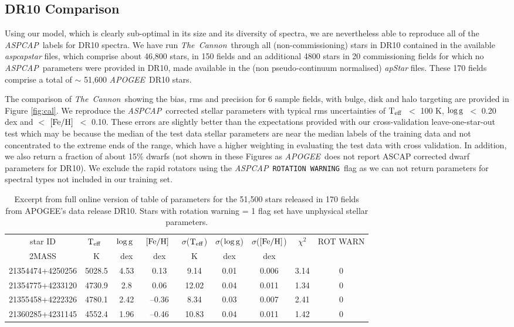 \documentclass[12pt, preprint]{aastex}
\newcommand{\teff}{\mbox{$\rm T_{eff}$}}
\newcommand{\feh}{\mbox{$\rm [Fe/H]$}}
\newcommand{\logg}{\mbox{$\rm \log g$}}
\newcommand{\tc}{\textsl{The~Cannon}}
\newcommand{\apogee}{\textsl{APOGEE}}
\newcommand{\aspcap}{\textsl{ASPCAP}}
\newcommand{\rotwarn}{\texttt{ROTATION WARNING}}
\begin{document}
\subsection{DR10 Comparison}

Using our model, which is clearly sub-optimal in its size and its diversity of spectra, we are nevertheless able to reproduce all of the \aspcap\ labels for DR10 spectra. We have run \tc\ through all (non-commissioning) stars in DR10 contained in the available \textit{aspcapstar} files,  which comprise about 46,800 stars, in 150 fields and an additional 4800 stars in 20 commissioning fields for which no \aspcap\ parameters were provided in DR10, made available in the (non pseudo-continuum normalised) \textit{apStar} files. These 170 fields comprise a total of $\sim$ 51,600 \apogee\ DR10 stars. 

The comparison of \tc\, showing the bias, rms and precision for 6 sample fields, with bulge, disk and halo targeting are provided in Figure \ref{fig:cal}. We reproduce the \aspcap\ corrected stellar parameters with typical rms uncertainties of \teff\ $<$ 100 K, \logg\ $<$ 0.20 dex and $<$ \feh\ $<$ 0.10. These errors are slightly better than the expectations provided with our cross-validation leave-one-star-out test which may be because the median of the test data stellar parameters are near the median labels of the training data and not concentrated to the extreme ends of the range, which have a higher weighting in evaluating the test data with cross validation. In addition, we also return a fraction of about 15\% dwarfs (not shown in these Figures as \apogee\ does not report ASCAP corrected dwarf parameters for DR10). We exclude the rapid rotators using the \aspcap\ \rotwarn\ flag as we can not return parameters for spectral types not included in our training set. 

\begin{table}[!h]
\small{
\centering
\caption{Excerpt from full online version of table of parameters for the 51,500 stars released in 170 fields from APOGEE's data release DR10. Stars with rotation warning = 1 flag set have unphysical stellar parameters.} \begin{tabular}{| c | c | c |  c | c | c |  c | c | c |}
\hline
star ID & \teff\ & \logg\ & \feh\ & $\sigma$(\teff) & $\sigma$(\logg) & $\sigma$(\feh) & $\chi^2$ & \tiny{ROT WARN}\\
{2MASS} &  K &  dex  & dex & K & dex & dex & & \\    
\hline
21354474+4250256 & 5028.5 & 4.53 & 0.13 & 9.14 & 0.01 & 0.006 & 3.14 & 0\\
21354775+4233120 & 4730.9 & 2.8 & 0.06 & 12.02 & 0.04 & 0.011 & 1.34 & 0\\
21355458+4222326 & 4780.1 & 2.42 & --0.36 & 8.34 & 0.03 & 0.007 & 2.41 & 0\\
21360285+4231145 &  4552.4 &  1.96 & --0.46  & 10.83 & 0.04 & 0.011 &  1.42 &  0\\
 \hline
\end{tabular}
\label{tab:online} }
\end{table}  
 
\end{document}

